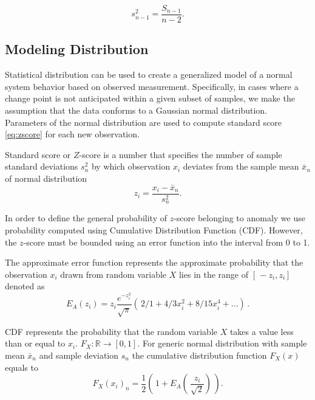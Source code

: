 \begin{equation}
s^2_{n-1} = \frac{S_{n-1}}{n-2}\text{.}\label{eq:revvar}
\end{equation}

\subsection{Modeling Distribution}\label{AA:Distribution}
Statistical distribution can be used to create a generalized model of a normal system behavior based on observed measurement. Specifically, in cases where a change point is not anticipated within a given subset of samples, we make the assumption that the data conforms to a Gaussian normal distribution. Parameters of the normal distribution are used to compute  standard score \eqref{eq:zscore} for each new observation. 

\begin{definition}
Standard score or \(Z\)-score is a number that specifies the number of sample standard deviations \(s^2_n\) by which observation \(x_i\) deviates from the sample mean \(\bar x_n\) of normal distribution
\begin{equation}
z_i = \frac{x_i - \bar x_n}{s^2_n}\text{.}\label{eq:zscore}
\end{equation}
\end{definition}

In order to define the general probability of \(z\)-score belonging to anomaly we use probability computed using Cumulative Distribution Function (CDF). However, the \(z\)-score must be bounded using an error function into the interval from 0 to 1.

\begin{definition}
The approximate error function represents the approximate probability that the observation \(x_i\) drawn from random variable \(X\) lies in the range of \([\,-z_i,z_i]\,\) denoted as
\begin{equation}
E_A (z_i) = z_i\frac{e^{-z^2_i}}{\sqrt{\pi}}( \,2/1 + 4/3x^2_i + 8/15 x^4_i + ...) \,\text{.}\label{eq:erf}
\end{equation}
\end{definition}

\begin{definition}
CDF represents the probability that the random variable \(X\) takes a value less than or equal to \(x_i\). \(F_X\colon \mathbb{R} \to [0,1]\). For generic normal distribution with sample mean \(\bar x_n\) and sample deviation \(s_n\) the cumulative distribution function \(F_X(x)\) equals to
\begin{equation}
F_X(x_i)_n = \frac{1}{2}( \,1+E_A(\,\frac{z_i}{\sqrt{2}})\,) \text{.}\label{eq:cdf}
\end{equation}
\end{definition}

